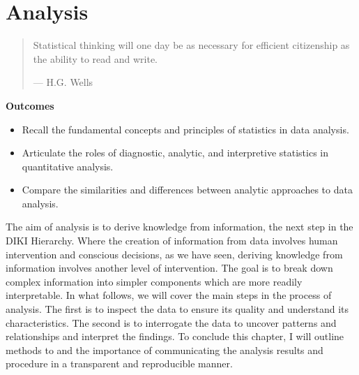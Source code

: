 \documentclass[
  letterpaper,
]{latex/krantz}
\providecommand{\tightlist}{%
  \setlength{\itemsep}{0pt}\setlength{\parskip}{0pt}}\usepackage{longtable,booktabs,array}
\theoremstyle{definition}
\theoremstyle{remark}
\begin{document}
\chapter{Analysis}\label{sec-analysis-chapter}

\begin{quote}
Statistical thinking will one day be as necessary for efficient
citizenship as the ability to read and write.

--- H.G. Wells
\end{quote}

\begin{tcolorbox}[enhanced jigsaw, colback=white, colframe=quarto-callout-color-frame, leftrule=.75mm, opacityback=0, rightrule=.15mm, bottomrule=.15mm, toprule=.15mm, breakable, left=2mm, arc=.35mm]

\textbf{ Outcomes}

\begin{itemize}
\tightlist
\item
  Recall the fundamental concepts and principles of statistics in data
  analysis.
\item
  Articulate the roles of diagnostic, analytic, and interpretive
  statistics in quantitative analysis.
\item
  Compare the similarities and differences between analytic approaches
  to data analysis.
\end{itemize}

\end{tcolorbox}

The aim of analysis is to derive knowledge from information, the next
step in the DIKI Hierarchy. Where the creation of information from data
involves human intervention and conscious decisions, as we have seen,
deriving knowledge from information involves another level of
intervention. The goal is to break down complex information into simpler
components which are more readily interpretable. In what follows, we
will cover the main steps in the process of analysis. The first is to
inspect the data to ensure its quality and understand its
characteristics. The second is to interrogate the data to uncover
patterns and relationships and interpret the findings. To conclude this
chapter, I will outline methods to and the importance of communicating
the analysis results and procedure in a transparent and reproducible
manner.
\end{document}
